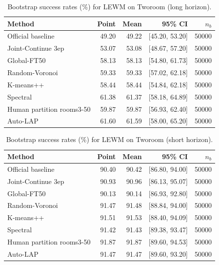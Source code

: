 \begin{table}[t]
\centering
\small
\caption{Bootstrap success rates (\%) for LEWM on Tworoom (long horizon).}
\begin{tabular}{lrrrr}
\toprule
Method & Point & Mean & 95\% CI & $n_b$ \\
\midrule
Official baseline & 49.20 & 49.22 & [45.20, 53.20] & 50000 \\
Joint-Continue 3ep & 53.07 & 53.08 & [48.67, 57.20] & 50000 \\
Global-FT50 & 58.13 & 58.13 & [54.80, 61.73] & 50000 \\
Random-Voronoi & 59.33 & 59.33 & [57.02, 62.18] & 50000 \\
K-means++ & 58.44 & 58.44 & [54.84, 62.18] & 50000 \\
Spectral & 61.38 & 61.37 & [58.18, 64.89] & 50000 \\
Human partition rooms3-50 & 59.87 & 59.87 & [56.93, 62.40] & 50000 \\
Auto-LAP & 61.60 & 61.59 & [58.00, 65.20] & 50000 \\
\bottomrule
\end{tabular}
\end{table}

\begin{table}[t]
\centering
\small
\caption{Bootstrap success rates (\%) for LEWM on Tworoom (short horizon).}
\begin{tabular}{lrrrr}
\toprule
Method & Point & Mean & 95\% CI & $n_b$ \\
\midrule
Official baseline & 90.40 & 90.42 & [86.80, 94.00] & 50000 \\
Joint-Continue 3ep & 90.93 & 90.96 & [86.13, 95.07] & 50000 \\
Global-FT50 & 90.13 & 90.14 & [86.93, 92.80] & 50000 \\
Random-Voronoi & 91.47 & 91.48 & [88.84, 94.00] & 50000 \\
K-means++ & 91.51 & 91.53 & [88.40, 94.09] & 50000 \\
Spectral & 91.42 & 91.43 & [89.38, 93.47] & 50000 \\
Human partition rooms3-50 & 91.87 & 91.87 & [89.60, 94.53] & 50000 \\
Auto-LAP & 91.47 & 91.47 & [89.60, 93.20] & 50000 \\
\bottomrule
\end{tabular}
\end{table}

